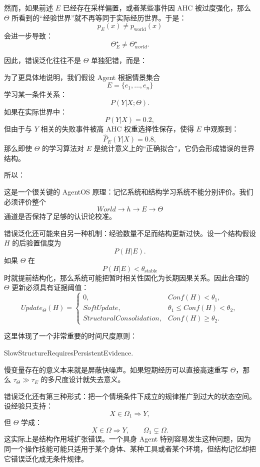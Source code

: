 然而，如果前述 $E$ 已经存在采样偏置，或者某些事件因 AHC 被过度强化，那么 $\Theta$ 所看到的“经验世界”就不再等同于实际经历世界。于是：
\[
p_E(x)\neq p_{\mathrm{world}}(x)
\]
会进一步导致：
\[
\Theta^\star_E
\neq
\Theta^\star_{world}.
\]

因此，错误泛化往往不是 $\Theta$ 单独犯错，而是：
\begin{statementbox}
\centering
{}
\end{statementbox}

为了更具体地说明，我们假设 Agent 根据情景集合
\[
E=\{e_1,\ldots,e_n\}
\]
学习某一条件关系：
\[
P(Y|X;\Theta).
\]
如果在实际世界中：
\[
P(Y|X)=0.2,
\]
但由于与 $Y$ 相关的失败事件被高 AHC 权重选择性保存，使得 $E$ 中观察到：
\[
\hat P_E(Y|X)=0.8,
\]
那么即使 $\Theta$ 的学习算法对 $E$ 是统计意义上的“正确拟合”，它仍会形成错误的世界结构。

所以：
\begin{statementbox}
\centering
{}
\end{statementbox}

这是一个很关键的 AgentOS 原理：记忆系统和结构学习系统不能分别评价。我们必须评价整个
\[
World\rightarrow h\rightarrow E\rightarrow\Theta
\]
通道是否保持了足够的认识论校准。

错误泛化还可能来自另一种机制：经验数量不足而结构更新过快。设一个结构假设 $H$ 的后验置信度为
\[
P(H|E).
\]
如果 $\Theta$ 在
\[
P(H|E)<\theta_{\mathrm{stable}}
\]
时就提前结构化，那么系统可能把暂时相关性固化为长期因果关系。因此合理的 $\Theta$ 更新必须具有证据阈值：
\[
Update_\Theta(H)
=
\begin{cases}
0, & Conf(H)<\theta_1,\\
SoftUpdate, & \theta_1\le Conf(H)<\theta_2,\\
StructuralConsolidation, & Conf(H)\ge\theta_2.
\end{cases}
\]

这里体现了一个非常重要的时间尺度原则：
\begin{statementbox}
SlowStructureRequiresPersistentEvidence.
\end{statementbox}

慢变量存在的意义本来就是屏蔽快噪声。如果短期经历可以直接高速重写 $\Theta$，那么 $\tau_\Theta\gg\tau_E$ 的多尺度设计就失去意义。

错误泛化还有第三种形式：把一个情境条件下成立的规律推广到过大的状态空间。设经验只支持：
\[
X\in\Omega_1
\Rightarrow
Y,
\]
但 $\Theta$ 学成：
\[
X\in\Omega
\Rightarrow
Y,
\qquad
\Omega_1\subsetneq\Omega.
\]
这实际上是结构作用域扩张错误。一个具身 Agent 特别容易发生这种问题，因为同一个操作技能可能只适用于某个身体、某种工具或者某个环境，但结构记忆却把它错误泛化成无条件规律。


